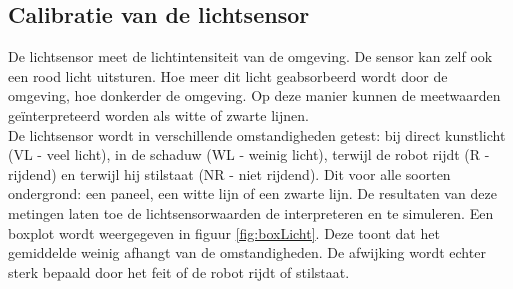 \documentclass[tt3]{penoverslag}
\newcommand{\boxplot}[6]{%
	\filldraw[fill=white,line width=0.2mm] let \n{boxxl}={#1-0.1}, \n{boxxr}={#1+0.1} in (axis cs:\n{boxxl},#3) rectangle (axis cs:\n{boxxr},#4);   %
	\draw[line width=0.2mm, color=red] let \n{boxxl}={#1-0.1}, \n{boxxr}={#1+0.1} in (axis cs:\n{boxxl},#2) -- (axis cs:\n{boxxr},#2);             %
	\draw[line width=0.2mm] (axis cs:#1,#4) -- (axis cs:#1,#6);                                                                           %
	\draw[line width=0.2mm] let \n{whiskerl}={#1-0.025}, \n{whiskerr}={#1+0.025} in (axis cs:\n{whiskerl},#6) -- (axis cs:\n{whiskerr},#6);        %
	\draw[line width=0.2mm] (axis cs:#1,#3) -- (axis cs:#1,#5);                                                                           %
	\draw[line width=0.2mm] let \n{whiskerl}={#1-0.025}, \n{whiskerr}={#1+0.025} in (axis cs:\n{whiskerl},#5) -- (axis cs:\n{whiskerr},#5);        %
	}
\begin{document}
\subsection{Calibratie van de lichtsensor} %
\label{ssec:calibLS}
De lichtsensor meet de lichtintensiteit van de omgeving. De sensor kan zelf ook een rood licht uitsturen. Hoe meer dit licht geabsorbeerd wordt door de omgeving, hoe donkerder de omgeving. Op deze manier kunnen de meetwaarden ge\"interpreteerd worden als witte of zwarte lijnen.\\
De lichtsensor wordt in verschillende omstandigheden getest: bij direct kunstlicht (VL - veel licht), in de schaduw (WL - weinig licht), terwijl de robot rijdt (R - rijdend) en terwijl hij stilstaat (NR - niet rijdend). Dit voor alle soorten ondergrond: een paneel, een witte lijn of een zwarte lijn. De resultaten van deze metingen laten toe de lichtsensorwaarden de interpreteren en te simuleren. Een boxplot wordt weergegeven in figuur \ref{fig:boxLicht}. Deze toont dat het gemiddelde weinig afhangt van de omstandigheden. De afwijking wordt echter sterk bepaald door het feit of de robot rijdt of stilstaat.

\tikzset{external/remake next}
\begin{center}
\end{center}

\tikzset{external/remake next}
\begin{center}
\end{center}
\end{document}
